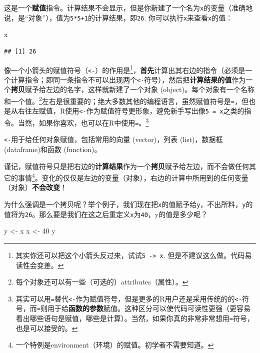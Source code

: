 \documentclass[]{book}
\newenvironment{Shaded}{\begin{snugshade}}{\end{snugshade}}
\newcommand{\DecValTok}[1]{\textcolor[rgb]{0.00,0.00,0.81}{#1}}
\newcommand{\NormalTok}[1]{#1}
\newcommand{\StringTok}[1]{\textcolor[rgb]{0.31,0.60,0.02}{#1}}
\let\rmarkdownfootnote\footnote%
\def\footnote{\protect\rmarkdownfootnote}
\begin{document}
这是一个\textbf{赋值}指令。计算结果不会显示，但是你新建了一个名为\texttt{x}的变量（准确地说，是``对象''），值为\texttt{5*5+1}的计算结果，即\texttt{26}. 你可以执行\texttt{x}来查看\texttt{x}的值：

\begin{Shaded}
\begin{Highlighting}[]
\NormalTok{x}
\end{Highlighting}
\end{Shaded}

\begin{verbatim}
## [1] 26
\end{verbatim}

像一个小箭头的赋值符号（\texttt{\textless{}-}）的作用是\footnote{其实你还可以把这个小箭头反过来，试试\texttt{5\ -\textgreater{}\ x}. 但是不建议这么做。代码易读性会变差。}，\textbf{首先}计算出其右边的指令（必须是一个计算指令；即同一条指令不可以出现两个\texttt{\textless{}-}符号），然后把\textbf{计算结果的值}作为一个\textbf{拷贝}赋予给左边的名字，这样就新建了一个对象 (object)。每个对象有一个名称和一个值。\footnote{每个对象还可以有一些（可选的）attributes（属性）。}左右是很重要的；绝大多数其他的编程语言，虽然赋值符号是\texttt{=}，但也是从右往左赋值，R使用\texttt{\textless{}-}作为赋值符号更形象，避免新手写出像\texttt{5\ =\ x}之类的指令。当然，如果你喜欢，也可以在R中使用\texttt{=}。\footnote{其实可以用\texttt{=}替代\texttt{\textless{}-}作为赋值符号，但是更多的R用户还是采用传统的的\texttt{\textless{}-}符号，而\texttt{=}则用于给\textbf{函数的参数}赋值。这种区分可以使代码可读性更强（更容易看出哪些语句是赋值，哪些是计算）。当然，如果你真的非常非常想用\texttt{=}符号，也是可以接受的。}

\texttt{\textless{}-}用于给任何对象赋值，包括常用的向量 (vector)，列表 (list)，数据框 (dataframe)和函数 (function)。

谨记，赋值符号只是把右边的\textbf{计算结果}作为一个\textbf{拷贝}赋予给左边，而不会做任何其它的事情\footnote{一个特例是environment（环境）的赋值。初学者不需要知道。}。变化的仅仅是左边的变量（对象），右边的计算中所用到的任何变量（对象）\textbf{不会改变}！

为什么强调是一个拷贝呢？举个例子，我们现在把\texttt{x}的值赋予给\texttt{y}，不出所料，\texttt{y}的值将为\texttt{26}。那么要是我们在这之后重定义\texttt{x}为\texttt{40}，y的值是多少呢？

\begin{Shaded}
\begin{Highlighting}[]
\NormalTok{y <-}\StringTok{ }\NormalTok{x}
\NormalTok{x <-}\StringTok{ }\DecValTok{40}
\NormalTok{y}
\end{Highlighting}
\end{Shaded}
\end{document}
